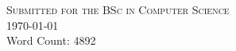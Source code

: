 \begin{titlepage}
\textsc{\large Submitted for the BSc in Computer Science}\\[0.5cm]



{\large \today}\\[0.5cm] %

{\large Word Count: 4892}\\[2cm]


\\[1cm]
 

\vfill %

\end{titlepage}
